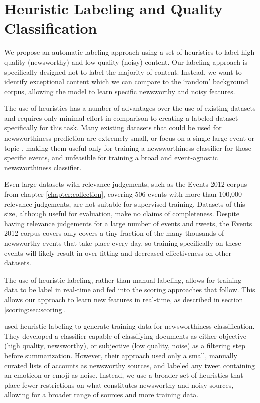 
\section{Heuristic Labeling and Quality Classification}
\label{scoring:sec:labelling}
We propose an automatic labeling approach using a set of heuristics to label high quality (newsworthy) and low quality (noisy) content.
Our labeling approach is specifically designed not to label the majority of content.
Instead, we want to identify exceptional content which we can compare to the `random' background corpus, allowing the model to learn specific newsworthy and noisy features.

The use of heuristics has a number of advantages over the use of existing datasets and requires only minimal effort in comparison to creating a labeled dataset specifically for this task.
Many existing datasets that could be used for newsworthiness prediction are extremely small, or focus on a single large event or topic \citep{Kang12, Madhawa15}, making them useful only for training a newsworthiness classifier for those specific events, and unfeasible for training a broad and event-agnostic newsworthiness classifier.

Even large datasets with relevance judgements, such as the Events 2012 corpus from chapter \ref{chapter:collection}, covering 506 events with more than 100,000 relevance judgements, are not suitable for supervised training.
Datasets of this size, although useful for evaluation, make no claims of completeness.
Despite having relevance judgements  for a large number of events and tweets, the Events 2012 corpus covers only covers a tiny fraction of the many thousands of newsworthy events that take place every day, so training specifically on these events will likely result in over-fitting and decreased effectiveness on other datasets.

The use of heuristic labeling, rather than manual labeling, allows for training data to be label in real-time and fed into the scoring approaches that follow.
This allows our approach to learn new features in real-time, as described in section \ref{scoring:sec:scoring}.

\cite{Madhawa15} used heuristic labeling to generate training data for newsworthiness classification.
They developed a classifier capable of classifying documents as either objective (high quality, newsworthy), or subjective (low quality, noise) as a filtering step before summarization.
However, their approach used only a small, manually curated lists of accounts as newsworthy sources, and labeled any tweet containing an emoticon or emoji as noise.
Instead, we use a broader set of heuristics that place fewer restrictions on what constitutes newsworthy and noisy sources, allowing for a broader range of sources and more training data.

